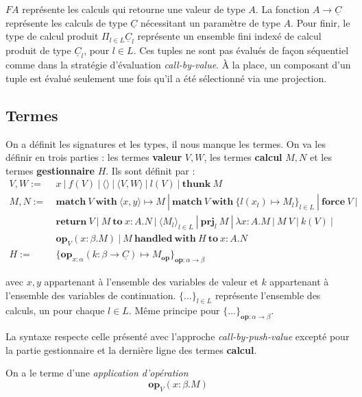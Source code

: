 	$FA$ représente les calculs qui retourne une valeur de type $A$. La fonction $A \rightarrow \underline{C}$ représente les calculs de type $\underline{C}$ nécessitant un paramètre de type $A$. Pour finir, le type de calcul produit $\Pi_{l\in L} \underline{C}_l$ représente un ensemble fini indexé de calcul produit de type $\underline{C}_l$, pour $l \in L$. Ces tuples ne sont pas évalués de façon séquentiel comme dans la stratégie d'évaluation \textit{call-by-value}. À la place, un composant d'un tuple est évalué seulement une fois qu'il a été sélectionné via une projection. 
	
\subsection{Termes}

	On a définit les signatures et les types, il nous manque les termes. On va les définir en trois parties : les termes \textbf{valeur} $V,W$, les termes \textbf{calcul} $M,N$ et les termes \textbf{gestionnaire} $H$. Ils sont définit par :
	\begin{align*}
		V,W :=&~x~|~f(V)~|~\langle\rangle~|~\langle V,W\rangle~|~l(V)~|~\textbf{thunk}~M\\
		M,N :=&~\textbf{match}~V~\textbf{with}~\langle x,y\rangle  \mapsto M~|~\textbf{match}~V~\textbf{with}~\{l(x_l)  \mapsto M_l\}_{l \in L}~|~\textbf{force}~V~|\\
		&~\textbf{return}~V~|~M~\textbf{to}~x:A.N~|~\langle M_l\rangle_{l \in L}~|~\textbf{prj}_l~M~|~\lambda x:A.M~|~M~V~|~k(V)~|\\
		&~\textbf{op}_V(x:\beta .M)~|~M~\textbf{handled}~\textbf{with}~H~\textbf{to}~x:A.N\\
		H :=&~\{\textbf{op}_{x:\alpha}(k:\beta \rightarrow \underline{C}) \mapsto M_\textbf{op} \}_{\textbf{op}:\alpha \rightarrow \beta}
	\end{align*}
	
	avec $x,y$ appartenant à l'ensemble des variables de valeur et $k$ appartenant à l'ensemble des variables de continuation. $\{...\}_{l \in L}$ représente l'ensemble des calculs, un pour chaque $l \in L$. Même principe pour $\{...\}_{\textbf{op} : \alpha \rightarrow \beta}$.

	La syntaxe respecte celle présenté avec l'approche \textit{call-by-push-value} excepté pour la partie gestionnaire et la dernière ligne des termes \textbf{calcul}.
	\smallbreak
	
	On a le terme d'une \textit{application d'opération}
		\[\textbf{op}_V(x:\beta .M)\]
	
